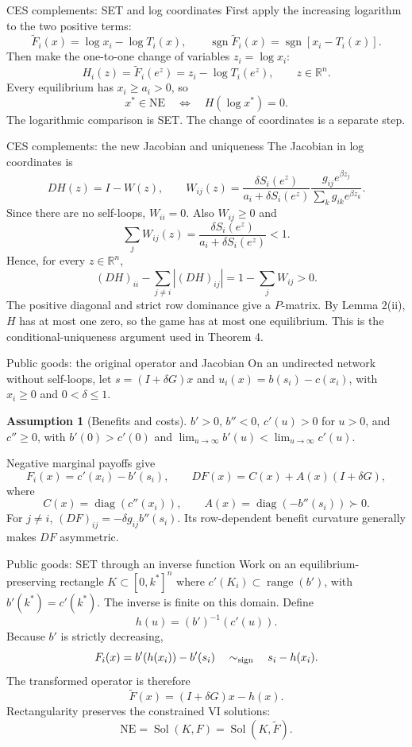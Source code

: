 \documentclass[11pt,aspectratio=169]{beamer}
\theoremstyle{plain}
\theoremstyle{definition}
\newtheorem{assumption}{Assumption}
\newcommand{\R}{\mathbb{R}}
\DeclareMathOperator{\sgn}{sgn}
\DeclareMathOperator{\Sol}{Sol}
\DeclareMathOperator{\diag}{diag}
\newcommand{\compactmath}{%
 \setlength{\abovedisplayskip}{4pt}\setlength{\belowdisplayskip}{4pt}%
 \setlength{\abovedisplayshortskip}{2pt}\setlength{\belowdisplayshortskip}{4pt}}
\begin{document}
\begin{frame}{CES complements: SET and log coordinates}
\compactmath
First apply the increasing logarithm to the two positive terms:
\[
 \widetilde F_i(x)=\log x_i-\log T_i(x),
 \qquad
 \sgn\widetilde F_i(x)=\sgn\!\left[x_i-T_i(x)\right].
\]
Then make the one-to-one change of variables $z_i=\log x_i$:
\[
 H_i(z)=\widetilde F_i(e^z)=z_i-\log T_i(e^z),\qquad z\in\R^n.
\]
Every equilibrium has $x_i\geq a_i>0$, so
\[
 \boxed{x^*\in\mathrm{NE}\quad\Longleftrightarrow\quad H(\log x^*)=0.}
\]
The logarithmic comparison is SET. The change of coordinates is a separate step.
\end{frame}


\begin{frame}{CES complements: the new Jacobian and uniqueness}
\small\compactmath
The Jacobian in log coordinates is
\[
 \boxed{DH(z)=I-W(z),}\qquad
 W_{ij}(z)=
 \frac{\delta S_i(e^z)}{a_i+\delta S_i(e^z)}
 \frac{g_{ij}e^{\beta z_j}}{\sum_k g_{ik}e^{\beta z_k}}.
\]
Since there are no self-loops, $W_{ii}=0$. Also $W_{ij}\geq0$ and
\[
 \sum_jW_{ij}(z)=\frac{\delta S_i(e^z)}{a_i+\delta S_i(e^z)}<1.
\]
Hence, for every $z\in\R^n$,
\[
 (DH)_{ii}-\sum_{j\ne i}|(DH)_{ij}|
 =1-\sum_jW_{ij}>0.
\]
The positive diagonal and strict row dominance give a $P$-matrix.
By Lemma 2(ii), $H$ has at most one zero, so the game has \alert{at most one}
equilibrium. This is the conditional-uniqueness argument used in Theorem 4.
\end{frame}


\begin{frame}{Public goods: the original operator and Jacobian}
\small\compactmath
On an undirected network without self-loops, let
$s=(I+\delta G)x$ and $u_i(x)=b(s_i)-c(x_i)$, with $x_i\geq0$ and $0<\delta\leq1$.
\setcounter{assumption}{1}
\begin{assumption}[Benefits and costs]
$b'>0$, $b''<0$, $c'(u)>0$ for $u>0$, and $c''\geq0$, with
$b'(0)>c'(0)$ and $\lim_{u\to\infty}b'(u)<\lim_{u\to\infty}c'(u)$.
\end{assumption}
Negative marginal payoffs give
\[
 F_i(x)=c'(x_i)-b'(s_i),\qquad
 \boxed{DF(x)=C(x)+A(x)(I+\delta G),}
\]
where
\[
 C(x)=\diag(c''(x_i)),\qquad A(x)=\diag(-b''(s_i))\succ0.
\]
For $j\ne i$, $(DF)_{ij}=-\delta g_{ij}b''(s_i)$.
Its row-dependent benefit curvature generally makes $DF$ asymmetric.
\end{frame}


\begin{frame}{Public goods: SET through an inverse function}
\compactmath
Work on an equilibrium-preserving rectangle $K\subset[0,k^*]^n$ where
$c'(K_i)\subset\operatorname{range}(b')$, with $b'(k^*)=c'(k^*)$.
The inverse is finite on this domain. Define
\[
 h(u)=(b')^{-1}(c'(u)).
\]
Because $b'$ is strictly decreasing,
\[
 F_i(x)=b'(h(x_i))-b'(s_i)
 \quad\sim_{\rm sign}\quad s_i-h(x_i).
\]
The transformed operator is therefore
\[
 \boxed{\widetilde F(x)=(I+\delta G)x-h(x).}
\]
Rectangularity preserves the constrained VI solutions:
\[
 \mathrm{NE}=\Sol(K,F)=\Sol(K,\widetilde F).
\]
\end{frame}
\end{document}
